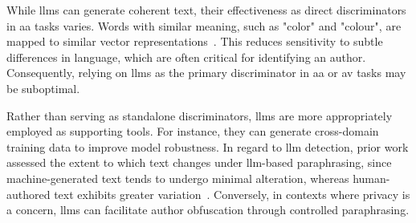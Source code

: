 While \acp{llm} can generate coherent text, their effectiveness as direct discriminators in \ac{aa} tasks varies. 
Words with similar meaning, such as "color" and "colour", are mapped to similar vector representations~\citep{altakrori_topic_2021}.
This reduces sensitivity to subtle differences in language, which are often critical for identifying an author. 
Consequently, relying on \acp{llm} as the primary discriminator in \ac{aa} or \ac{av} tasks may be suboptimal.

Rather than serving as standalone discriminators, \acp{llm} are more appropriately employed as supporting tools. 
For instance, they can generate cross-domain training data to improve model robustness. 
In regard to \ac{llm} detection, prior work assessed the extent to which text changes under \ac{llm}-based paraphrasing, since machine-generated text tends to undergo minimal alteration, whereas human-authored text exhibits greater variation~\citep{mao_raidar_2024}.
Conversely, in contexts where privacy is a concern, \acp{llm} can facilitate author obfuscation through controlled paraphrasing. 